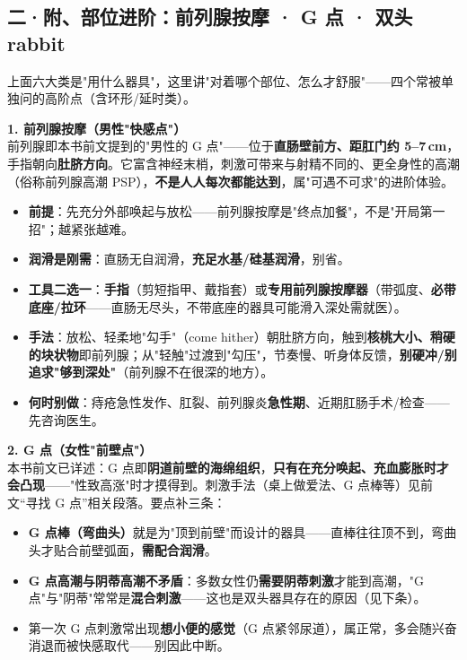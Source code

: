 \documentclass[12pt,UTF8,openany]{ctexbook}
\begin{document}
\subsection*{二·附、部位进阶：前列腺按摩 · G 点 · 双头 rabbit}

上面六大类是"用什么器具"，这里讲"对着哪个部位、怎么才舒服"——四个常被单独问的高阶点（含环形/延时类）。

\textbf{1. 前列腺按摩（男性"快感点"）}\\
前列腺即本书前文提到的"男性的 G 点"——位于\textbf{直肠壁前方、距肛门约 5--7\,cm}，手指朝向\textbf{肚脐方向}。它富含神经末梢，刺激可带来与射精不同的、更全身性的高潮（俗称前列腺高潮 PSP），\textbf{不是人人每次都能达到}，属"可遇不可求"的进阶体验。
\begin{itemize}[leftmargin=2em,itemsep=0.2em]
  \item \textbf{前提}：先充分外部唤起与放松——前列腺按摩是"终点加餐"，不是"开局第一招"；越紧张越难。
  \item \textbf{润滑是刚需}：直肠无自润滑，\textbf{充足水基/硅基润滑}，别省。
  \item \textbf{工具二选一}：\textbf{手指}（剪短指甲、戴指套）或\textbf{专用前列腺按摩器}（带弧度、\textbf{必带底座/拉环}——直肠无尽头，不带底座的器具可能滑入深处需就医）。
  \item \textbf{手法}：放松、轻柔地"勾手"（come hither）朝肚脐方向，触到\textbf{核桃大小、稍硬的块状物}即前列腺；从"轻触"过渡到"勾压"，节奏慢、听身体反馈，\textbf{别硬冲/别追求"够到深处"}（前列腺不在很深的地方）。
  \item \textbf{何时别做}：痔疮急性发作、肛裂、前列腺炎\textbf{急性期}、近期肛肠手术/检查——先咨询医生。
\end{itemize}

\textbf{2. G 点（女性"前壁点"）}\\
本书前文已详述：G 点即\textbf{阴道前壁的海绵组织}，\textbf{只有在充分唤起、充血膨胀时才会凸现}——"性致高涨"时才摸得到。刺激手法（桌上做爱法、G 点棒等）见前文“寻找 G 点”相关段落。要点补三条：
\begin{itemize}[leftmargin=2em,itemsep=0.2em]
  \item \textbf{G 点棒（弯曲头）}就是为"顶到前壁"而设计的器具——直棒往往顶不到，弯曲头才贴合前壁弧面，\textbf{需配合润滑}。
  \item \textbf{G 点高潮与阴蒂高潮不矛盾}：多数女性仍\textbf{需要阴蒂刺激}才能到高潮，"G 点"与"阴蒂"常常是\textbf{混合刺激}——这也是双头器具存在的原因（见下条）。
  \item 第一次 G 点刺激常出现\textbf{想小便的感觉}（G 点紧邻尿道），属正常，多会随兴奋消退而被快感取代——别因此中断。
\end{itemize}
\end{document}
